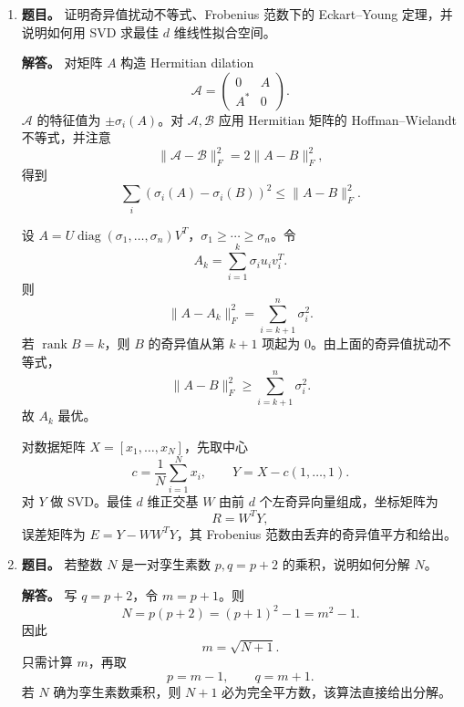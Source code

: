 ﻿\documentclass[UTF8,12pt]{ctexart}
\begin{document}
\begin{enumerate}[label=\textbf{\arabic*.},leftmargin=2.2em]
\textbf{解答。} FTCS 格式为
\[
U_j^{n+1}=U_j^n-\frac{\lambda}{2}(U_{j+1}^n-U_{j-1}^n),
\qquad \lambda=\frac{\Delta t}{\Delta x}.
\]
取 Fourier 模态 \(U_j^n=G^n e^{ij\theta}\)，得
\[
G(\theta)=1-i\lambda\sin\theta,\qquad
|G(\theta)|^2=1+\lambda^2\sin^2\theta.
\]
只要 \(\lambda\ne0\)，存在 \(\theta\) 使 \(|G|>1\)，故 FTCS 对该双曲方程不稳定，也不能由固定 CFL 下的 Lax 等价定理推出收敛。

稳定修改包括：迎风格式
\[
U_j^{n+1}=U_j^n-\lambda(U_j^n-U_{j-1}^n),
\quad 0\le\lambda\le1;
\]
Lax--Friedrichs 格式
\[
U_j^{n+1}=\frac12(U_{j+1}^n+U_{j-1}^n)
-\frac{\lambda}{2}(U_{j+1}^n-U_{j-1}^n);
\]
以及 Lax--Wendroff 格式
\[
U_j^{n+1}=U_j^n-\frac{\lambda}{2}(U_{j+1}^n-U_{j-1}^n)
\frac{\lambda^2}{2}(U_{j+1}^n-2U_j^n+U_{j-1}^n).
\]
后两者在 \(|\lambda|\le1\) 下稳定。

\item \textbf{题目。} 证明奇异值扰动不等式、Frobenius 范数下的 Eckart--Young 定理，并说明如何用 SVD 求最佳 \(d\) 维线性拟合空间。

\textbf{解答。} 对矩阵 \(A\) 构造 Hermitian dilation
\[
\mathcal A=\begin{pmatrix}0&A\\A^\ast&0\end{pmatrix}.
\]
\(\mathcal A\) 的特征值为 \(\pm\sigma_i(A)\)。对 \(\mathcal A,\mathcal B\) 应用 Hermitian 矩阵的 Hoffman--Wielandt 不等式，并注意
\[
\|\mathcal A-\mathcal B\|_F^2=2\|A-B\|_F^2,
\]
得到
\[
\sum_i(\sigma_i(A)-\sigma_i(B))^2\le \|A-B\|_F^2.
\]

设 \(A=U\operatorname{diag}(\sigma_1,\ldots,\sigma_n)V^T\)，\(\sigma_1\ge\cdots\ge\sigma_n\)。令
\[
A_k=\sum_{i=1}^k\sigma_i u_i v_i^T.
\]
则
\[
\|A-A_k\|_F^2=\sum_{i=k+1}^n\sigma_i^2.
\]
若 \(\operatorname{rank}B=k\)，则 \(B\) 的奇异值从第 \(k+1\) 项起为 \(0\)。由上面的奇异值扰动不等式，
\[
\|A-B\|_F^2\ge \sum_{i=k+1}^n\sigma_i^2.
\]
故 \(A_k\) 最优。

对数据矩阵 \(X=[x_1,\ldots,x_N]\)，先取中心
\[
c=\frac1N\sum_{i=1}^N x_i,\qquad Y=X-c(1,\ldots,1).
\]
对 \(Y\) 做 SVD。最佳 \(d\) 维正交基 \(W\) 由前 \(d\) 个左奇异向量组成，坐标矩阵为
\[
R=W^TY,
\]
误差矩阵为 \(E=Y-WW^TY\)，其 Frobenius 范数由丢弃的奇异值平方和给出。

\item \textbf{题目。} 若整数 \(N\) 是一对孪生素数 \(p,q=p+2\) 的乘积，说明如何分解 \(N\)。

\textbf{解答。} 写 \(q=p+2\)，令 \(m=p+1\)。则
\[
N=p(p+2)=(p+1)^2-1=m^2-1.
\]
因此
\[
m=\sqrt{N+1}.
\]
只需计算 \(m\)，再取
\[
p=m-1,\qquad q=m+1.
\]
若 \(N\) 确为孪生素数乘积，则 \(N+1\) 必为完全平方数，该算法直接给出分解。
\end{enumerate}
\end{document}
